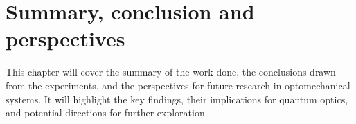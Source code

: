 \chapter*{Summary, conclusion and perspectives}
This chapter will cover the summary of the work done, the conclusions drawn from the experiments, and the perspectives for future research in optomechanical systems. It will highlight the key findings, their implications for quantum optics, and potential directions for further exploration.
